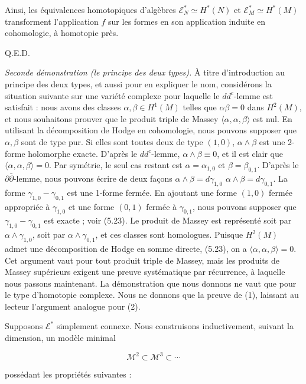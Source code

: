 \documentclass[
  french,
  a3paper,
  a3paper]{extarticle}
\begin{document}
Ainsi, les équivalences homotopiques d'algèbres
\(\mathcal{E}_N^*\simeq H^*(N)\) et \(\mathcal{E}_M^*\simeq H^*(M)\)
transforment l'application \(f\) sur les formes en son application
induite en cohomologie, à homotopie près.

Q.E.D.

\emph{Seconde démonstration (le principe des deux types).} À titre
d'introduction au principe des deux types, et aussi pour en expliquer le
nom, considérons la situation suivante sur une variété complexe pour
laquelle le \(dd^c\)-lemme est satisfait : nous avons des classes
\(\alpha,\beta\in H^1(M)\) telles que \(\alpha\beta=0\) dans \(H^2(M)\),
et nous souhaitons prouver que le produit triple de Massey
\(\langle\alpha,\alpha,\beta\rangle\) est nul. En utilisant la
décomposition de Hodge en cohomologie, nous pouvons supposer que
\(\alpha,\beta\) sont de type pur. Si elles sont toutes deux de type
\((1,0)\), \(\alpha\wedge\beta\) est une 2-forme holomorphe exacte.
D'après le \(dd^c\)-lemme, \(\alpha\wedge\beta\equiv0\), et il est clair
que \(\langle\alpha,\alpha,\beta\rangle=0\). Par symétrie, le seul cas
restant est \(\alpha=\alpha_{1,0}\) et \(\beta=\beta_{0,1}\). D'après le
\(\partial\bar\partial\)-lemme, nous pouvons écrire de deux façons
\(\alpha\wedge\beta=d\gamma_{1,0}\) \(\alpha\wedge\beta=d\gamma_{0,1}\).
La forme \(\gamma_{1,0}-\gamma_{0,1}\) est une 1-forme fermée. En
ajoutant une forme \((1,0)\) fermée appropriée à \(\gamma_{1,0}\) et une
forme \((0,1)\) fermée à \(\gamma_{0,1}\), nous pouvons supposer que
\(\gamma_{1,0}-\gamma_{0,1}\) est exacte ; voir (5.23). Le produit de
Massey est représenté soit par \(\alpha\wedge\gamma_{1,0}\), soit par
\(\alpha\wedge\gamma_{0,1}\), et ces classes sont homologues. Puisque
\(H^2(M)\) admet une décomposition de Hodge en somme directe, (5.23), on
a \(\langle\alpha,\alpha,\beta\rangle=0\). Cet argument vaut pour tout
produit triple de Massey, mais les produits de Massey supérieurs exigent
une preuve systématique par récurrence, à laquelle nous passons
maintenant. La démonstration que nous donnons ne vaut que pour le type
d'homotopie complexe. Nous ne donnons que la preuve de (1), laissant au
lecteur l'argument analogue pour (2).

Supposons \(\mathcal{E}^*\) simplement connexe. Nous construisons
inductivement, suivant la dimension, un modèle minimal

\[\mathcal{M}^2\subset\mathcal{M}^3\subset\cdots\]

possédant les propriétés suivantes :
\end{document}
